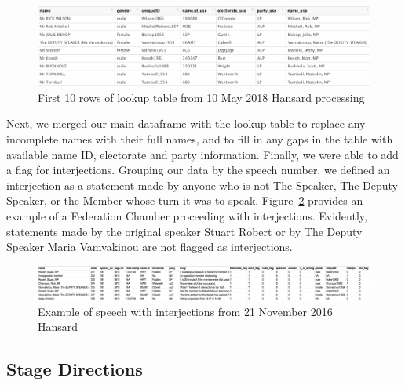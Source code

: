 \documentclass[
  letterpaper,
  DIV=11,
  numbers=noendperiod]{scrartcl}
\begin{document}
\begin{figure}

{\centering \includegraphics[width=4.66667in,height=\textheight]{lookup_ex.png}

}

\caption{\label{fig-lookup}First 10 rows of lookup table from 10 May
2018 Hansard processing}

\end{figure}

Next, we merged our main dataframe with the lookup table to replace any
incomplete names with their full names, and to fill in any gaps in the
table with available name ID, electorate and party information. Finally,
we were able to add a flag for interjections. Grouping our data by the
speech number, we defined an interjection as a statement made by anyone
who is not The Speaker, The Deputy Speaker, or the Member whose turn it
was to speak. Figure~\ref{fig-interject} provides an example of a
Federation Chamber proceeding with interjections. Evidently, statements
made by the original speaker Stuart Robert or by The Deputy Speaker
Maria Vamvakinou are not flagged as interjections.

\begin{figure}

{\centering \includegraphics{interject_ex.png}

}

\caption{\label{fig-interject}Example of speech with interjections from
21 November 2016 Hansard}

\end{figure}

\hypertarget{sec-stage}{%
\subsection{Stage Directions}\label{sec-stage}}
\end{document}
